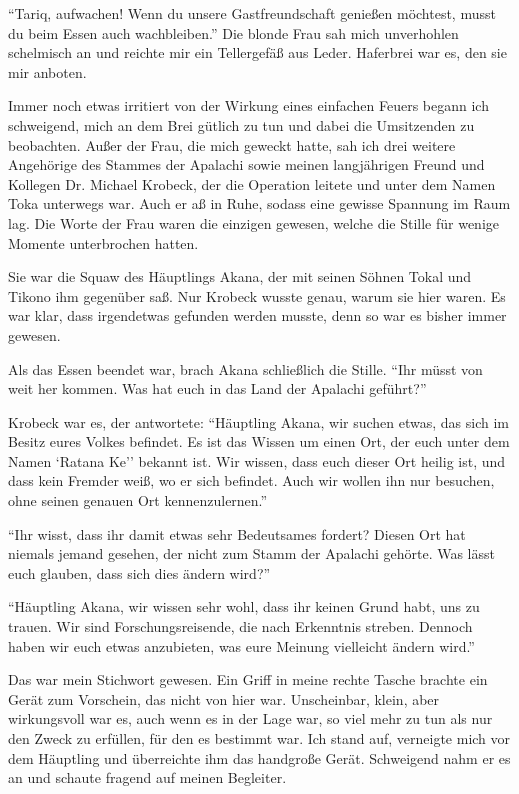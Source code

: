 \enquote{Tariq, aufwachen! Wenn du unsere Gastfreundschaft genießen möchtest, musst du beim Essen auch wachbleiben.}
Die blonde Frau sah mich unverhohlen schelmisch an und reichte mir ein Tellergefäß aus Leder. Haferbrei war es, den sie mir anboten.

Immer noch etwas irritiert von der Wirkung eines einfachen Feuers begann ich schweigend, mich an dem Brei gütlich zu tun und dabei die Umsitzenden zu beobachten. Außer der Frau, die mich geweckt hatte, sah ich drei weitere Angehörige des Stammes der Apalachi sowie meinen langjährigen Freund und Kollegen Dr. Michael Krobeck, der die Operation leitete und unter dem Namen Toka unterwegs war. Auch er aß in Ruhe, sodass eine gewisse Spannung im Raum lag. Die Worte der Frau waren die einzigen gewesen, welche die Stille für wenige Momente unterbrochen hatten.

Sie war die Squaw des Häuptlings Akana, der mit seinen Söhnen Tokal und Tikono ihm gegenüber saß. 
Nur Krobeck wusste genau, warum sie hier waren. Es war klar, dass irgendetwas gefunden werden musste, denn so war es bisher immer gewesen.

Als das Essen beendet war, brach Akana schließlich die Stille. \enquote{Ihr müsst von weit her kommen. Was hat euch in das Land der Apalachi geführt?}

Krobeck war es, der antwortete: \enquote{Häuptling Akana, wir suchen etwas, das sich im Besitz eures Volkes befindet. Es ist das Wissen um einen Ort, der euch unter dem Namen \enquote{Ratana Ke'} bekannt ist. Wir wissen, dass euch dieser Ort heilig ist, und dass kein Fremder weiß, wo er sich befindet. Auch wir wollen ihn nur besuchen, ohne seinen genauen Ort kennenzulernen.}

\enquote{Ihr wisst, dass ihr damit etwas sehr Bedeutsames fordert? Diesen Ort hat niemals jemand gesehen, der nicht zum Stamm der Apalachi gehörte. Was lässt euch glauben, dass sich dies ändern wird?}

\enquote{Häuptling Akana, wir wissen sehr wohl, dass ihr keinen Grund habt, uns zu trauen. Wir sind Forschungsreisende, die nach Erkenntnis streben. Dennoch haben wir euch etwas anzubieten, was eure Meinung vielleicht ändern wird.}

Das war mein Stichwort gewesen. Ein Griff in meine rechte Tasche brachte ein Gerät zum Vorschein, das nicht von hier war. Unscheinbar, klein, aber wirkungsvoll war es, auch wenn es in der Lage war, so viel mehr zu tun als nur den Zweck zu erfüllen, für den es bestimmt war. 
Ich stand auf, verneigte mich vor dem Häuptling und überreichte ihm das handgroße Gerät. Schweigend nahm er es an und schaute fragend auf meinen Begleiter.


